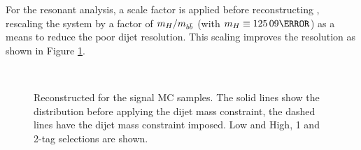 For the resonant analysis, a scale factor is applied before reconstructing \myybb, rescaling the \bb system by a factor of $m_{H}/m_{b\bar{b}}$ (with $m_H \equiv \unit{125.09}{\GeV}$) as a means to reduce the poor dijet resolution. This scaling improves the \myybb resolution as shown in Figure \ref{fig:resolution-myybb}.


\begin{figure}[htbp]
  \centering
  \\
  \caption[Reconstructed \myybb for the signal \gls{MC} samples, with and without the dijet mass constraint]
  {Reconstructed \myybb for the signal \gls{MC} samples. The solid lines show the distribution before applying the dijet mass constraint, the dashed lines have the dijet mass constraint imposed. Low and High, 1 and 2-tag selections are shown.}
  \label{fig:resolution-myybb}
\end{figure}
